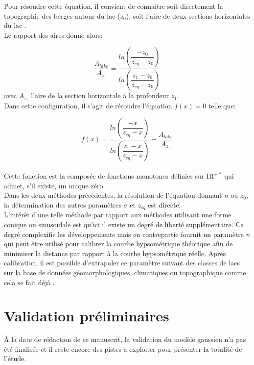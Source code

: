 \noindent Pour résoudre cette équation, il convient de connaitre soit directement la topographie des berges autour du lac ($z_0$), soit l'aire de deux sections horizontales du lac .\\
Le rapport des aires donne alors:

\begin{equation}
\dfrac{A_{lake}}{A_{z_1}} = \dfrac{ln\left(\dfrac{-z_0}{z_{eq}-z_0}\right)}{ln\left(\dfrac{z_1-z_0}{z_{eq}-z_0}\right)}
\end{equation} 
avec $A_{z_1}$ l'aire de la section horizontale à la profondeur $z_1$.\\

\noindent Dans cette configuration, il s'agit de résoudre l'équation $f(x)=0$ telle que:

\begin{equation}
f(x) = \dfrac{ln \left(\dfrac{-x}{z_{eq}-x}\right)}{ln\left(\dfrac{z_1-x}{z_{eq}-x}\right)} - \dfrac{A_{lake}}{A_{z_1}}
\end{equation}
~\\

\noindent Cette fonction est la composée de fonctions monotones définies sur $\mathrm{I\! R}^{+*}$ qui admet, s'il existe, un unique zéro.\\

\noindent Dans les deux méthodes précédentes, la résolution de l'équation donnant $n$ ou $z_0$, la détermination des autres paramètres $\sigma$ et $z_{eq}$ est directe.\\

\noindent L'intérêt d'une telle méthode par rapport aux méthodes utilisant une forme conique ou sinusoïdale est qu'ici il existe un degré de liberté supplémentaire. Ce degré complexifie les développements mais en contrepartie fournit un paramètre $n$ qui peut être utilisé pour calibrer la courbe hypsométrique théorique afin de minimiser la distance par rapport à la courbe hypsométrique réelle. Après calibration, il est possible d'extrapoler ce paramètre suivant des classes de lacs sur la base de données géomorphologiques, climatiques ou topographique comme cela se fait déjà \citep{koshinsky1970,johansson2007}. 
\section{{\selectfont Validation préliminaires}}

À la date de rédaction de ce manuscrit, la validation du modèle gaussien n'a pas été finalisée et il reste encore des pistes à exploiter pour présenter la totalité de l'étude.

